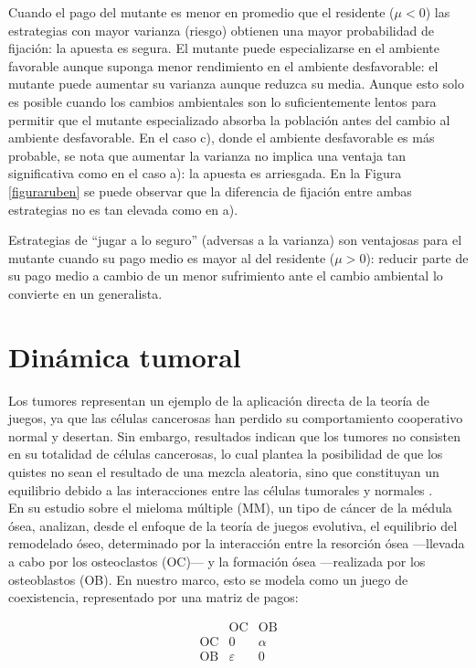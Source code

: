 \documentclass[%
 sor,
 jor,
 amsmath,amssymb,
 reprint,%
]{revtex4-2}
\begin{document}
Cuando el pago del mutante es menor en promedio que el residente ($\mu < 0$) las estrategias con mayor varianza (riesgo) obtienen una mayor probabilidad de fijación: la apuesta es segura. El mutante puede especializarse en el ambiente favorable aunque suponga menor rendimiento en el ambiente desfavorable: el mutante puede aumentar su varianza aunque reduzca su media.
Aunque esto solo es posible cuando los cambios ambientales son lo suficientemente lentos para permitir que el mutante especializado absorba la población antes del cambio al ambiente desfavorable. En el caso c), donde el ambiente desfavorable es más probable, se nota que aumentar la varianza no implica una ventaja tan significativa como en el caso a): la apuesta es arriesgada.
En la Figura \ref{figuraruben} se puede observar que la diferencia de fijación entre ambas estrategias no es tan elevada como en a).

Estrategias de ``jugar a lo seguro'' (adversas a la varianza) son ventajosas para el mutante cuando su pago medio es mayor al del residente ($\mu > 0$): reducir parte de su pago medio a cambio de un menor sufrimiento ante el cambio ambiental lo convierte en un generalista.


\section{Dinámica tumoral}
\label{cancer}

Los tumores representan un ejemplo de la aplicación directa de la teoría de juegos, ya que las células cancerosas han perdido su comportamiento cooperativo normal y desertan. Sin embargo, resultados indican que los tumores no consisten en su totalidad de células cancerosas, lo cual plantea la posibilidad de que los quistes no sean el resultado de una mezcla aleatoria, sino que constituyan un equilibrio debido a las interacciones entre las células tumorales y normales \cite{Gerstung2011}. \\

 En su estudio sobre el mieloma múltiple (MM), un tipo de cáncer de la médula ósea, \cite{Pacheco2014} analizan, desde el enfoque de la teoría de juegos evolutiva, el equilibrio del remodelado óseo, determinado por la interacción entre la resorción ósea —llevada a cabo por los osteoclastos (OC)— y la formación ósea —realizada por los osteoblastos (OB). En nuestro marco, esto se modela como un juego de coexistencia, representado por una matriz de pagos:

\[
\begin{array}{c|cc}
     & \text{OC} & \text{OB} \\
\hline
\text{OC} & 0 & \alpha \\
\text{OB} & \varepsilon & 0 \\
\end{array}
\]
\end{document}

